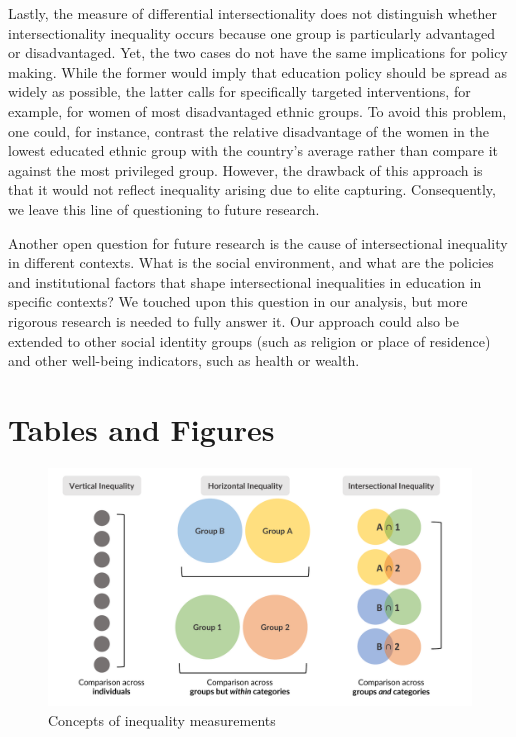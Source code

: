 Lastly, the measure of differential intersectionality does not distinguish whether intersectionality inequality occurs because one group is particularly advantaged or disadvantaged. Yet, the two cases do not have the same implications for policy making. While the former would imply that education policy should be spread as widely as possible, the latter calls for specifically targeted interventions, for example, for women of most disadvantaged ethnic groups. To avoid this problem, one could, for instance, contrast the relative disadvantage of the women in the lowest educated ethnic group with the country's average rather than compare it against the most privileged group. However, the drawback of this approach is that it would not reflect inequality arising due to elite capturing. Consequently, we leave this line of questioning to future research. 

Another open question for future research is the cause of intersectional inequality in different contexts. What is the social environment, and what are the policies and institutional factors that shape intersectional inequalities in education in specific contexts? We touched upon this question in our analysis, but more rigorous research is needed to fully answer it. Our approach could also be extended to other social identity groups (such as religion or place of residence) and other well-being indicators, such as health or wealth.

\clearpage
\FloatBarrier


\clearpage

\section*{Tables and Figures}

\begin{figure}[htb]
\includegraphics{latex/figures/intersectionality_framework.pdf} \caption[Concepts of inequality measurement]{Concepts of inequality measurements}\label{fig:intersectionality-framework}
\end{figure}

